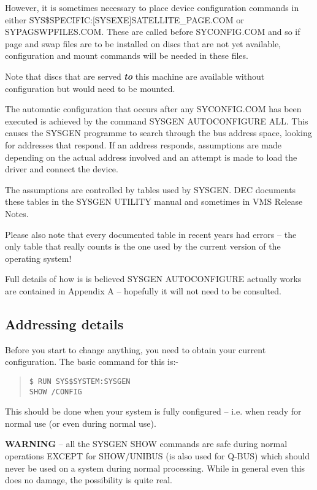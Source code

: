 \begin{sloppypar}
However, it is sometimes necessary to place device configuration commands
in either SYS\$SPECIFIC:[SYSEXE]SATELLITE\_PAGE.COM or SYPAGSWPFILES.COM.
These are called before SYCONFIG.COM and so if page and swap files are to
be installed on discs that are not yet available, configuration and mount
commands will be needed in these files.
\end{sloppypar}

Note that discs that are served {\bf\it to} this machine are available without
configuration but would need to be mounted.

The automatic configuration that occurs after any SYCONFIG.COM has been 
executed is achieved by the command SYSGEN AUTOCONFIGURE ALL.
This causes the SYSGEN programme to search through the bus address space,
looking for addresses that respond.
If an address responds, assumptions are made depending on the actual address
involved and an attempt is made to load the driver and connect the device.

The assumptions are controlled by tables used by SYSGEN.
DEC documents these tables in the SYSGEN UTILITY manual and sometimes in
VMS Release Notes.

Please also note that every documented table in recent years had errors
--  the only table that really counts is the one used by the current version
of the operating system!

Full details of how is is believed SYSGEN AUTOCONFIGURE actually works
  are contained in Appendix A -- hopefully it will not need to be consulted.

\subsection{Addressing details}

Before you start to change anything, you need to obtain your
 current configuration. The basic command for this is:-
\begin{quote}
\begin{verbatim}
$ RUN SYS$SYSTEM:SYSGEN
SHOW /CONFIG
\end{verbatim}
\end{quote}

This should be done when your system is fully configured -- i.e.
when ready for normal use (or even during normal use).

{\bf WARNING} -- all the SYSGEN SHOW commands are safe during normal
 operations EXCEPT for SHOW/UNIBUS (is also used for Q-BUS) which should
 never be used on a system during normal processing.
While in general even this does no damage, the possibility is quite real.

